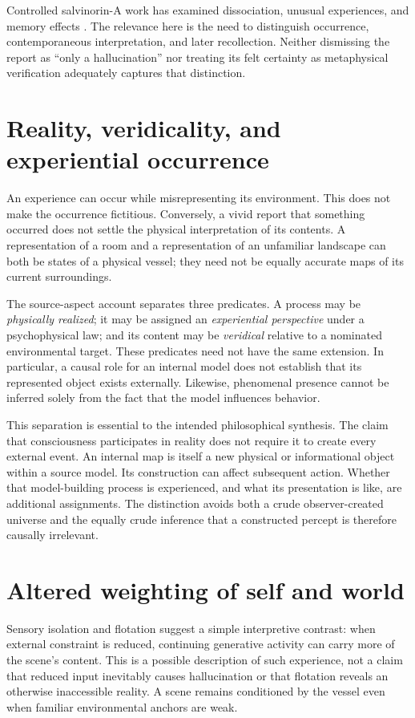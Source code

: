 Controlled salvinorin-A work has examined dissociation, unusual experiences, and memory effects \cite{MacLean2013}. The relevance here is the need to distinguish occurrence, contemporaneous interpretation, and later recollection. Neither dismissing the report as ``only a hallucination'' nor treating its felt certainty as metaphysical verification adequately captures that distinction.

\section{Reality, veridicality, and experiential occurrence}\label{section:altered:reality-veridicality-and-experiential-occurrence}
An experience can occur while misrepresenting its environment. This does not make the occurrence fictitious. Conversely, a vivid report that something occurred does not settle the physical interpretation of its contents. A representation of a room and a representation of an unfamiliar landscape can both be states of a physical vessel; they need not be equally accurate maps of its current surroundings.

The source-aspect account separates three predicates. A process may be \emph{physically realized}; it may be assigned an \emph{experiential perspective} under a psychophysical law; and its content may be \emph{veridical} relative to a nominated environmental target. These predicates need not have the same extension. In particular, a causal role for an internal model does not establish that its represented object exists externally. Likewise, phenomenal presence cannot be inferred solely from the fact that the model influences behavior.

This separation is essential to the intended philosophical synthesis. The claim that consciousness participates in reality does not require it to create every external event. An internal map is itself a new physical or informational object within a source model. Its construction can affect subsequent action. Whether that model-building process is experienced, and what its presentation is like, are additional assignments. The distinction avoids both a crude observer-created universe and the equally crude inference that a constructed percept is therefore causally irrelevant.

\section{Altered weighting of self and world}\label{sec:altered-weighting}
Sensory isolation and flotation suggest a simple interpretive contrast: when external constraint is reduced, continuing generative activity can carry more of the scene's content. This is a possible description of such experience, not a claim that reduced input inevitably causes hallucination or that flotation reveals an otherwise inaccessible reality. A scene remains conditioned by the vessel even when familiar environmental anchors are weak.

